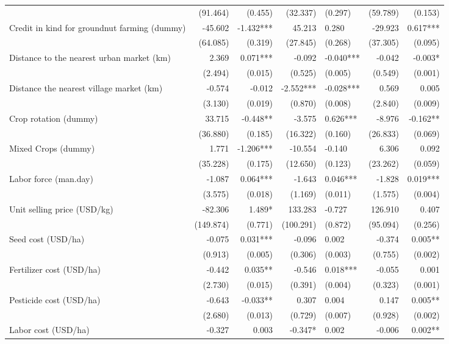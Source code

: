 \documentclass[
]{article}
\begin{document}
\begin{landscape}
\begin{longtable}[t]{lrrrlrr}
 & (91.464) & (0.455) & (32.337) & (0.297) & (59.789) & (0.153)\\
Credit in kind for groundnut farming (dummy) & -45.602 & -1.432*** & 45.213 & 0.280 & -29.923 & 0.617***\\
 & (64.085) & (0.319) & (27.845) & (0.268) & (37.305) & (0.095)\\
Distance to the nearest urban market (km) & 2.369 & 0.071*** & -0.092 & -0.040*** & -0.042 & -0.003*\\
\addlinespace
 & (2.494) & (0.015) & (0.525) & (0.005) & (0.549) & (0.001)\\
Distance the nearest village market (km) & -0.574 & -0.012 & -2.552*** & -0.028*** & 0.569 & 0.005\\
 & (3.130) & (0.019) & (0.870) & (0.008) & (2.840) & (0.009)\\
Crop rotation (dummy) & 33.715 & -0.448** & -3.575 & 0.626*** & -8.976 & -0.162**\\
 & (36.880) & (0.185) & (16.322) & (0.160) & (26.833) & (0.069)\\
\addlinespace
Mixed Crops (dummy) & 1.771 & -1.206*** & -10.554 & -0.140 & 6.306 & 0.092\\
 & (35.228) & (0.175) & (12.650) & (0.123) & (23.262) & (0.059)\\
Labor force (man.day) & -1.087 & 0.064*** & -1.643 & 0.046*** & -1.828 & 0.019***\\
 & (3.575) & (0.018) & (1.169) & (0.011) & (1.575) & (0.004)\\
Unit selling price (USD/kg) & -82.306 & 1.489* & 133.283 & -0.727 & 126.910 & 0.407\\
\addlinespace
 & (149.874) & (0.771) & (100.291) & (0.872) & (95.094) & (0.256)\\
Seed cost (USD/ha) & -0.075 & 0.031*** & -0.096 & 0.002 & -0.374 & 0.005**\\
 & (0.913) & (0.005) & (0.306) & (0.003) & (0.755) & (0.002)\\
Fertilizer cost (USD/ha) & -0.442 & 0.035** & -0.546 & 0.018*** & -0.055 & 0.001\\
 & (2.730) & (0.015) & (0.391) & (0.004) & (0.323) & (0.001)\\
\addlinespace
Pesticide cost (USD/ha) & -0.643 & -0.033** & 0.307 & 0.004 & 0.147 & 0.005**\\
 & (2.680) & (0.013) & (0.729) & (0.007) & (0.928) & (0.002)\\
Labor cost (USD/ha) & -0.327 & 0.003 & -0.347* & 0.002 & -0.006 & 0.002**\\

\end{longtable}
\end{landscape}
\end{document}
